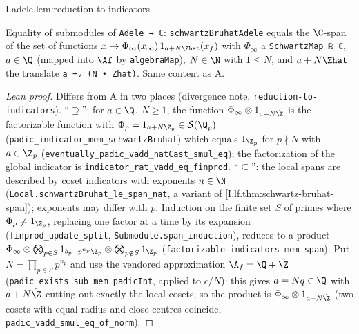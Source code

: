 \begin{lemma}
\end{lemma}
\begin{tfformal}{I.adele.lem:reduction-to-indicators}
\begin{tffidelity}
Equality of submodules of \texttt{Adele → ℂ}: \texttt{schwartzBruhatAdele} equals the $\C$-span of the set of functions $x\mapsto\Phi_\infty(x_\infty)\,1_{a+N\Zhat}(x_f)$ with $\Phi_\infty$ a \texttt{SchwartzMap ℝ ℂ}, $a\in\Q$ (mapped into $\Af$ by \texttt{algebraMap}), $N\in\N$ with $1\le N$, and $a+N\Zhat$ the translate \texttt{a +ᵥ (N • Zhat)}. Same content as A.
\end{tffidelity}
\end{tfformal}
\begin{proof}[Lean proof]
Differs from A in two places (divergence note, \texttt{reduction-to-indicators}). ``$\supseteq$'': for $a\in\Q$, $N\ge1$, the function $\Phi_\infty\otimes1_{a+N\hat\Z}$ is the factorizable function with $\Phi_p=1_{a+N\Z_p}\in\mathcal S(\Q_p)$ (\texttt{padic\_indicator\_mem\_schwartzBruhat}) which equals $1_{\Z_p}$ for $p\nmid N$ with $a\in\Z_p$ (\texttt{eventually\_padic\_vadd\_natCast\_smul\_eq}); the factorization of the global indicator is \texttt{indicator\_rat\_vadd\_eq\_finprod}. ``$\subseteq$'': the local spans are described by coset indicators with exponents $n\in\N$ (\texttt{Local.schwartzBruhat\_le\_span\_nat}, a variant of \cref{I.lf.thm:schwartz-bruhat-span}); exponents may differ with $p$. Induction on the finite set $S$ of primes where $\Phi_p\ne1_{\Z_p}$, replacing one factor at a time by its expansion (\texttt{finprod\_update\_split}, \texttt{Submodule.span\_induction}), reduces to a product $\Phi_\infty\otimes\bigotimes_{p\in S}1_{b_p+p^{n_p}\Z_p}\otimes\bigotimes_{p\notin S}1_{\Z_p}$ (\texttt{factorizable\_indicators\_mem\_span}). Put $N=\prod_{p\in S}p^{n_p}$ and use the vendored approximation $\A_f=\Q+\hat\Z$ (\texttt{padic\_exists\_sub\_mem\_padicInt}, applied to $c/N$): this gives $a=Nq\in\Q$ with $a+N\hat\Z$ cutting out exactly the local cosets, so the product is $\Phi_\infty\otimes1_{a+N\hat\Z}$ (two cosets with equal radius and close centres coincide, \texttt{padic\_vadd\_smul\_eq\_of\_norm}).
\end{proof}


